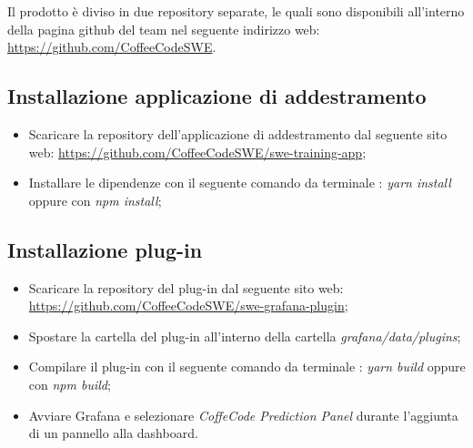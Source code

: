 \documentclass[../manuale-sviluppatore.tex]{subfiles}
\begin{document}
 Il prodotto è diviso in due repository separate, le quali sono disponibili all'interno della pagina github del team nel seguente indirizzo web: \url{https://github.com/CoffeeCodeSWE}.
\subsection{Installazione applicazione di addestramento}%
\label{subs:installazione_applicazione_di_addestramento}
\begin{itemize}
    \item Scaricare la repository dell'applicazione di addestramento dal seguente sito web: \url{https://github.com/CoffeeCodeSWE/swe-training-app};
    \item Installare le dipendenze con il seguente comando da terminale : \emph{yarn install} oppure con \emph{npm install};
\end{itemize}

\subsection{Installazione plug-in}
\label{subs:installazione_plug_in}
\begin{itemize}
    \item Scaricare la repository del plug-in dal seguente sito web: \url{https://github.com/CoffeeCodeSWE/swe-grafana-plugin};
    \item Spostare la cartella del plug-in all'interno della cartella \emph{grafana/data/plugins};
    \item Compilare il plug-in con il seguente comando da terminale : \emph{yarn build} oppure con \emph{npm build};
    \item Avviare Grafana e selezionare \emph{CoffeCode Prediction Panel} durante l'aggiunta di un pannello alla dashboard.
\end{itemize}
\end{document}
